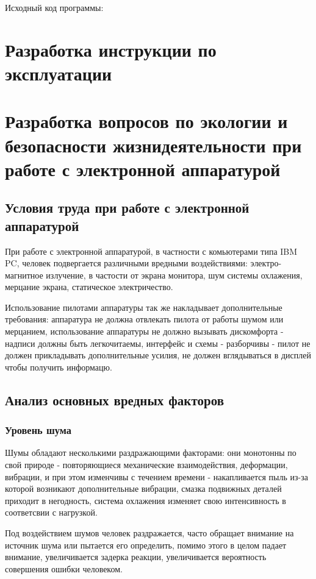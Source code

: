 \documentclass[a4paper,12pt]{report} %
\begin{document}
Исходный код программы:





\newpage
\chapter{Разработка инструкции по эксплуатации}
\newpage
\chapter{Разработка вопросов по экологии и безопасности жизнидеятельности при
  работе с электронной \newline аппаратурой} %
\section{Условия труда при работе с электронной аппаратурой}
При работе с электронной аппаратурой, в частности с комьютерами типа IBM PC,
человек подвергается различными вредными воздействиями: электро-магнитное
излучение, в частости от экрана монитора, шум системы охлажения, мерцание
экрана, статическое электричество.

Использование пилотами аппаратуры так же накладывает дополнительные требования:
аппаратура не должна отвлекать пилота от работы шумом или мерцанием,
использование аппаратуры не должно вызывать дискомфорта - надписи должны быть
легкочитаемы, интерфейс и схемы - разборчивы - пилот не должен прикладывать
дополнительные усилия, не должен вглядываться в дисплей чтобы получить
информацю.
\section{Анализ основных вредных факторов}
\subsection{Уровень шума}
Шумы обладают несколькими раздражающими факторами: они монотонны по свой природе
- повторяющиеся механические взаимодействия, деформации, вибрации, и при этом
изменчивы с течением времени - накапливается пыль из-за которой возникают
дополнительные вибрации, смазка подвижных деталей приходит в негодность, система
охлажения изменяет свою интенсивность в соответсвии с нагрузкой.

Под воздействием шумов человек раздражается, часто обращает внимание на источник
шума или пытается его определить, помимо этого в целом падает внимание,
увеличивается задерка реакции, увеличивается вероятность совершения ошибки
человеком.
\end{document}

